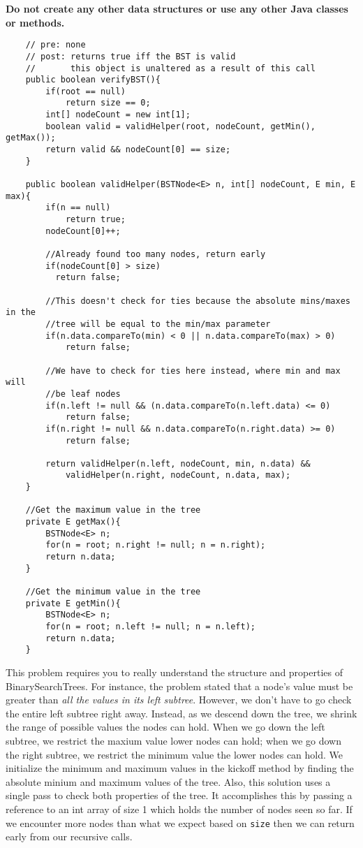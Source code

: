 \documentclass[12pt,letter]{article}
\begin{document}
\noindent \textbf{Do not create any other data structures or use any other Java classes or methods.}
\clearpage
\begin{verbatim}
    // pre: none
    // post: returns true iff the BST is valid
    //       this object is unaltered as a result of this call
    public boolean verifyBST(){
        if(root == null)
            return size == 0;
        int[] nodeCount = new int[1];
        boolean valid = validHelper(root, nodeCount, getMin(), getMax());
        return valid && nodeCount[0] == size;
    }

    public boolean validHelper(BSTNode<E> n, int[] nodeCount, E min, E max){
        if(n == null)
            return true;
        nodeCount[0]++;

        //Already found too many nodes, return early
        if(nodeCount[0] > size)
          return false;

        //This doesn't check for ties because the absolute mins/maxes in the
        //tree will be equal to the min/max parameter
        if(n.data.compareTo(min) < 0 || n.data.compareTo(max) > 0)
            return false;

        //We have to check for ties here instead, where min and max will
        //be leaf nodes
        if(n.left != null && (n.data.compareTo(n.left.data) <= 0)
            return false;
        if(n.right != null && n.data.compareTo(n.right.data) >= 0)
            return false;

        return validHelper(n.left, nodeCount, min, n.data) && 
            validHelper(n.right, nodeCount, n.data, max);
    }

    //Get the maximum value in the tree
    private E getMax(){
        BSTNode<E> n;
        for(n = root; n.right != null; n = n.right);
        return n.data;
    }

    //Get the minimum value in the tree
    private E getMin(){
        BSTNode<E> n;
        for(n = root; n.left != null; n = n.left);
        return n.data;
    }
\end{verbatim}

\noindent This problem requires you to really understand the structure and properties of BinarySearchTrees.
For instance, the problem stated that a node's value must be greater than \emph{all the values in its left subtree}. However,
we don't have to go check the entire left subtree right away. Instead, as we descend down the tree, we shrink the range of possible values the 
nodes can hold. When we go down the left subtree, we restrict the maxium value lower nodes can hold; when we go down the right subtree, we 
restrict the minimum value the lower nodes can hold. We initialize the minimum and maximum values in the kickoff method by finding the absolute
minium and maximum values of the tree.
\vspace{4pt}
\noindent Also, this solution uses a single pass to check both properties of the tree. It accomplishes this by passing a reference to an int
array of size 1 which holds the number of nodes seen so far. If we encounter more nodes than what we expect based on \texttt{size} then we
can return early from our recursive calls.
\end{document}
